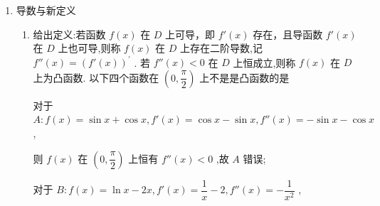 \begin{enumerate}
\begin{enumerate}
\begin{jieda}
\begin{enumerate}
                $\left\{\begin{array}{l}
                     sin\omega x_0 > 0 \\
                     cos\omega x_0 < 0
                \end{array}\right.$，故$\omega x_0 \in \left(2k\pi +\dfrac{1}{2}\pi, 2k\pi+\pi\right), k \in \mathbf{Z}$，由$\omega x_0 > 0$可知$k \geq 0$.

                假设$k > 0$，则$\varphi\left(x_0 - \dfrac{2k\pi}{\omega}\right) = -\omega^2cos\omega \left(x_0 - \dfrac{2k\pi}{\omega}\right) - \left(x_0 - \dfrac{2k\pi}{\omega}\right) = -\omega^2cos\omega x_0 - \left(x_0 - \dfrac{2k\pi}{\omega}\right) = \dfrac{2k\pi}{\omega} > 0$，与$\varphi(x) \leq 0$矛盾.

                故$k = 0$，$\omega x_0 \in \left(\dfrac{1}{2}\pi, \pi\right)$，即$\dfrac{\pi }{2\omega } < {x}_{0} < \dfrac{\pi }{\omega }$.
            \end{enumerate}
        \end{jieda}
    \end{enumerate}

    \item 导数与新定义
    \begin{enumerate}
        \item 给出定义:若函数 $f\left( x\right)$ 在 $D$ 上可导，即 $f'\left( x\right)$ 存在，且导函数 $f'\left( x\right)$ 在 $D$ 上也可导,则称 $f\left( x\right)$ 在 $D$ 上存在二阶导数,记 $f''\left( x\right)  = {\left( f'\left( x\right) \right) }^{\prime }$ . 若 $f''\left( x\right)  < 0$ 在 $D$ 上恒成立,则称 $f\left( x\right)$ 在 $D$ 上为凸函数. 以下四个函数在 $\left( {0,\dfrac{{\pi }}{2}}\right)$ 上不是是凸函数的是
        
        \begin{jieda}
            对于 ${A} : f\left( x\right)  = \sin x + \cos x,f'\left( x\right)  = \cos x - \sin x,f''\left( x\right)  =  - \sin x - \cos x$ ,
            
            则 $f\left( x\right)$ 在 $\left( {0,\dfrac{{\pi }}{2}}\right)$ 上恒有 ${f}''\left( x\right)  < 0$ ,故 ${A}$ 错误;
            
            对于 ${B} : f\left( x\right)  = \ln x - {2x},f'\left( x\right)  = \dfrac{1}{x} - 2,{f}''\left( x\right)  =  - \dfrac{1}{{x}^{2}}$ ,
            

\end{jieda}
\end{enumerate}
\end{enumerate}
